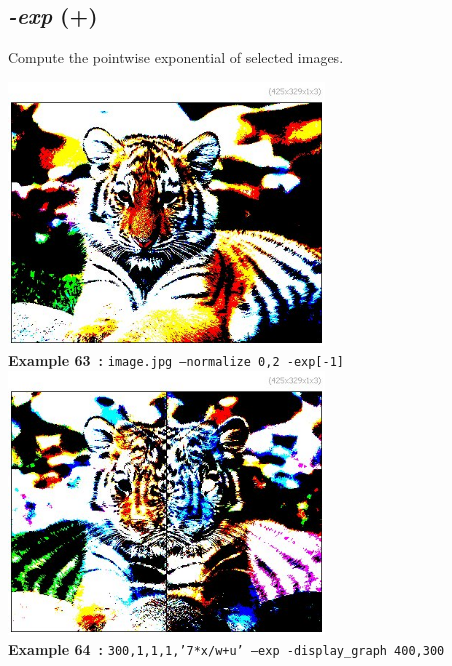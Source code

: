 \documentclass[a4paper,11pt,twoside]{book}
\begin{document}
\subsection{\emph{-exp} (+)}\vspace*{-0.5em}
Compute the pointwise exponential of selected images.
\begin{center}\includegraphics[keepaspectratio=true,height=7cm,width=\textwidth]{img/gmic_def63.jpg}\\
{\footnotesize \textbf{Example 63~:} \texttt{image.jpg --normalize 0,2 -exp[-1]}}
\\\includegraphics[keepaspectratio=true,height=7cm,width=\textwidth]{img/gmic_def64.jpg}\\
{\footnotesize \textbf{Example 64~:} \texttt{300,1,1,1,'7*x/w+u' --exp -display\_graph 400,300}}
\end{center}
\end{document}
